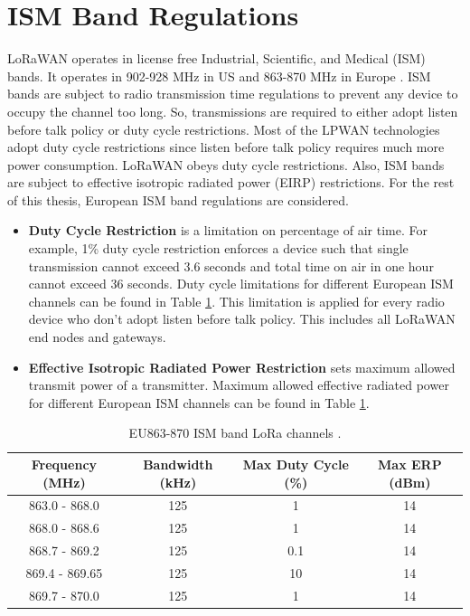 \section{ISM Band Regulations}
LoRaWAN operates in license free Industrial, Scientific, and Medical (ISM) bands. It operates in 902-928 MHz in US and 863-870 MHz in Europe \cite{lorawan.regional.parameters}. ISM bands are subject to radio transmission time regulations to prevent any device to occupy the channel too long. So, transmissions are required to either adopt listen before talk policy or duty cycle restrictions. Most of the LPWAN technologies adopt duty cycle restrictions since listen before talk policy requires much more power consumption. LoRaWAN obeys duty cycle restrictions. Also, ISM bands are subject to effective isotropic radiated power (EIRP) restrictions. For the rest of this thesis, European ISM band regulations are considered.

\begin{itemize}
  \item \textbf{Duty Cycle Restriction} is a limitation on percentage of air time. For example, 1\% duty cycle restriction enforces a device such that single transmission cannot exceed 3.6 seconds and total time on air in one hour cannot exceed 36 seconds. Duty cycle limitations for different European ISM channels can be found in Table \ref{table:max_tx_power}. This limitation is applied for every radio device who don't adopt listen before talk policy. This includes all LoRaWAN end nodes and gateways.
  \item \textbf{Effective Isotropic Radiated Power Restriction} sets maximum allowed transmit power of a transmitter. Maximum allowed effective radiated power for different European ISM channels can be found in Table \ref{table:max_tx_power}.
\end{itemize}


\begin{table}
\centering
\caption{EU863-870 ISM band LoRa channels \cite{EN300.220} \cite{lorawan.regional.parameters}.}
\label{table:max_tx_power}
\begin{tabular}{|c|c|c|c|}
\hline
\textbf{Frequency (MHz)} & \textbf{Bandwidth (kHz)} & \textbf{Max Duty Cycle (\%)} & \textbf{Max ERP (dBm)} \\ \hline
      863.0 - 868.0  &   125 &   1   &   14 \\ \hline
      868.0 - 868.6  &   125 &   1   &   14 \\ \hline
      868.7 - 869.2  &   125 &   0.1 &   14 \\ \hline
      869.4 - 869.65 &   125 &   10  &   14 \\ \hline
      869.7 - 870.0  &   125 &   1   &   14 \\ \hline
\end{tabular}
\end{table}
